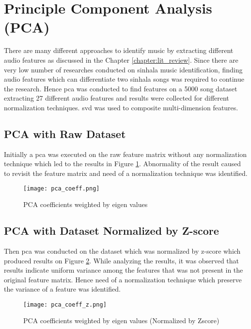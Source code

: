 \section{Principle Component Analysis (PCA)}
There are many different approaches to identify music by extracting different audio features as
discussed in the Chapter \ref{chapter:lit_review}. Since there are very low number of researches
conducted on sinhala music identification, finding audio features which can differentiate two 
sinhala songs was required to continue the research. Hence \ac{pca} was conducted to find features
on a 5000 song dataset extracting 27 different audio features and results were collected for 
different normalization techniques. \ac{svd} was used to composite multi-dimension features.

\subsection{PCA with Raw Dataset}

Initially a \ac{pca} was executed on the raw feature matrix without any normalization technique
which led to the results in Figure \ref{fig:pca_coeff}. Abnormality of the result caused to 
revisit the feature matrix and need of a normalization technique was identified. 

\begin{figure}[H]
    \centering
    \texttt{[image: pca\_coeff.png]}
    \caption{PCA coefficients weighted by eigen values}
    \label{fig:pca_coeff}
\end{figure}

\subsection{PCA with Dataset Normalized by Z-score}

Then \ac{pca} was conducted on the dataset which was normalized by z-score which produced results
on Figure \ref{fig:pca_coeff_z}. While analyzing the results, it was observed that results
indicate uniform variance among the features that was not present in the original feature
matrix. Hence need of a normalization technique which preserve the variance of a feature was
identified. 

\begin{figure}[H]
    \centering
    \texttt{[image: pca\_coeff\_z.png]}
    \caption{PCA coefficients weighted by eigen values (Normalized by Zscore)}
    \label{fig:pca_coeff_z}
\end{figure}

